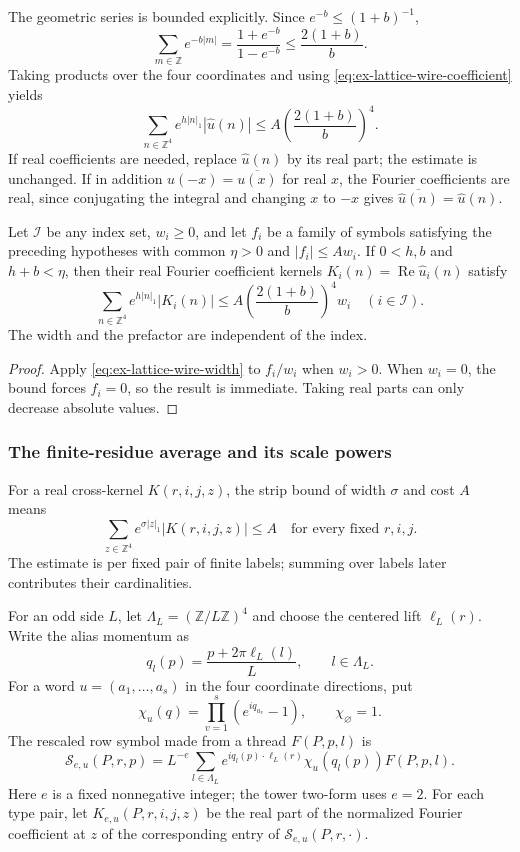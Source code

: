 The geometric series is bounded explicitly. Since
$e^{-b}\leq(1+b)^{-1}$,
\[
 \sum_{m\in\mathbb Z}e^{-b|m|}
 =\frac{1+e^{-b}}{1-e^{-b}}
 \leq\frac{2(1+b)}{b}.
\]
Taking products over the four coordinates and using
\eqref{eq:ex-lattice-wire-coefficient} yields
\begin{equation}
 \sum_{n\in\mathbb Z^4}e^{h|n|_1}|\widehat u(n)|
 \leq A\left(\frac{2(1+b)}{b}\right)^4.
 \label{eq:ex-lattice-wire-width}
\end{equation}
If real coefficients are needed, replace $\widehat u(n)$ by its real part;
the estimate is unchanged. If in addition
$u(-x)=\overline{u(x)}$ for real $x$, the Fourier coefficients are real,
since conjugating the integral and changing $x$ to $-x$ gives
$\overline{\widehat u(n)}=\widehat u(n)$.

\begin{lemma}
\label{lem:ex-lattice-uniform-strip-extraction}
Let $\mathcal I$ be any index set, $w_i\geq0$, and let $f_i$ be a family of
symbols satisfying the preceding hypotheses with common $\eta>0$ and
$|f_i|\leq A w_i$. If $0<h,b$ and $h+b<\eta$, then their real Fourier
coefficient kernels $K_i(n)=\operatorname{Re}\widehat u_i(n)$ satisfy
\[
 \sum_{n\in\mathbb Z^4}e^{h|n|_1}|K_i(n)|
 \leq A\left(\frac{2(1+b)}b\right)^4w_i
 \quad(i\in\mathcal I).
\]
The width and the prefactor are independent of the index.
\end{lemma}

\begin{proof}
Apply \eqref{eq:ex-lattice-wire-width} to $f_i/w_i$ when $w_i>0$.
When $w_i=0$, the bound forces $f_i=0$, so the result is immediate.
Taking real parts can only decrease absolute values.
\end{proof}

\subsubsection{The finite-residue average and its scale powers}

For a real cross-kernel $K(r,i,j,z)$, the strip bound of width $\sigma$
and cost $A$ means
\[
 \sum_{z\in\mathbb Z^4}e^{\sigma|z|_1}|K(r,i,j,z)|\leq A
 \quad\text{for every fixed }r,i,j.
\]
The estimate is per fixed pair of finite labels; summing over labels later
contributes their cardinalities.

For an odd side $L$, let $\Lambda_L=(\mathbb Z/L\mathbb Z)^4$ and choose
the centered lift $\ell_L(r)$. Write the alias momentum as
\[
 q_l(p)=\frac{p+2\pi\ell_L(l)}{L},\qquad l\in\Lambda_L.
\]
For a word $u=(a_1,\ldots,a_s)$ in the four coordinate directions, put
\[
 \chi_u(q)=\prod_{v=1}^s(e^{iq_{a_v}}-1),\qquad \chi_{\varnothing}=1.
\]
The rescaled row symbol made from a thread $F(P,p,l)$ is
\begin{equation}
 \mathcal S_{e,u}(P,r,p)=L^{-e}\sum_{l\in\Lambda_L}
       e^{i q_l(p)\cdot\ell_L(r)}\chi_u(q_l(p))F(P,p,l).
 \label{eq:ex-lattice-spread-symbol}
\end{equation}
Here $e$ is a fixed nonnegative integer; the tower two-form uses $e=2$.
For each type pair, let $K_{e,u}(P,r,i,j,z)$ be the real part of the
normalized Fourier coefficient at $z$ of the corresponding entry of
$\mathcal S_{e,u}(P,r,\cdot)$.

